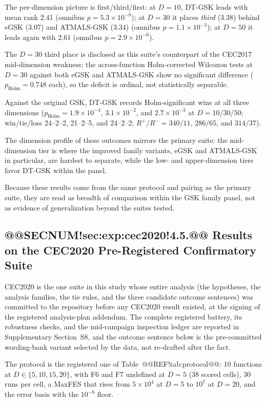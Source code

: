 \documentclass[10pt,a4paper]{article}
\newcommand{\dtgsk}{DT-GSK}
\newcommand{\atmals}{ATMALS-GSK}
\newcommand{\egsk}{eGSK}
\begin{document}
The per-dimension picture is first/third/first: at $D = 10$,
\dtgsk{} leads with mean rank 2.41 (omnibus
$p = 5.3 \times 10^{-8}$); at $D = 30$ it places \emph{third} (3.38)
behind \egsk{} (3.07) and \atmals{} (3.34) (omnibus
$p = 1.1 \times 10^{-3}$); at $D = 50$ it leads again with 2.61
(omnibus $p = 2.9 \times 10^{-6}$).

The $D = 30$ third place is disclosed as this suite's counterpart of
the CEC2017 mid-dimension weakness; the across-function
Holm-corrected Wilcoxon tests at $D = 30$ against both \egsk{} and
\atmals{} show no significant difference ($p_{\mathrm{Holm}} = 0.748$
each), so the deficit is ordinal, not statistically separable.

Against the original GSK, \dtgsk{} records Holm-significant wins at
all three dimensions
($p_{\mathrm{Holm}} = 1.9 \times 10^{-4}$, $3.1 \times 10^{-2}$, and
$2.7 \times 10^{-3}$ at $D = 10/30/50$; win/tie/loss 24--2--2,
21--2--5, and 24--2--2; $R^{+}/R^{-} = 340/11$, $286/65$, and
$314/37$).

The dimension profile of these outcomes mirrors the primary suite:
the mid-dimension tier is where the improved family variants,
\egsk{} and \atmals{} in particular, are hardest to separate,
while the low- and upper-dimension tiers favor \dtgsk{} within the
panel.

Because these results come from the same protocol and pairing as the
primary suite, they are read as breadth of comparison within the GSK
family panel, not as evidence of generalization beyond the suites
tested.



\subsection{@@SECNUM!sec:exp:cec2020!4.5.@@ Results on the CEC2020 Pre-Registered Confirmatory Suite}\label{sec:exp:cec2020}


CEC2020 is the one suite in this study whose entire analysis (the
hypotheses, the analysis families, the tie rules, and the three candidate
outcome sentences) was committed to the repository before any CEC2020
result existed, at the signing of the registered
analysis-plan addendum. The complete registered battery, its robustness
checks, and the mid-campaign inspection ledger are reported in
Supplementary Section~S8, and the outcome sentence below is the
pre-committed wording-bank variant selected by the data, not re-drafted
after the fact.

The protocol is the registered one of Table~@@REF!tab:protocol@@: 10
functions at $D \in \{5, 10, 15, 20\}$, with F6 and F7 undefined at
$D = 5$ (38 scored cells), 30 runs per cell, a MaxFES that rises from
$5 \times 10^{4}$ at $D = 5$ to $10^{7}$ at $D = 20$, and the error
basis with the $10^{-8}$ floor.
\end{document}

